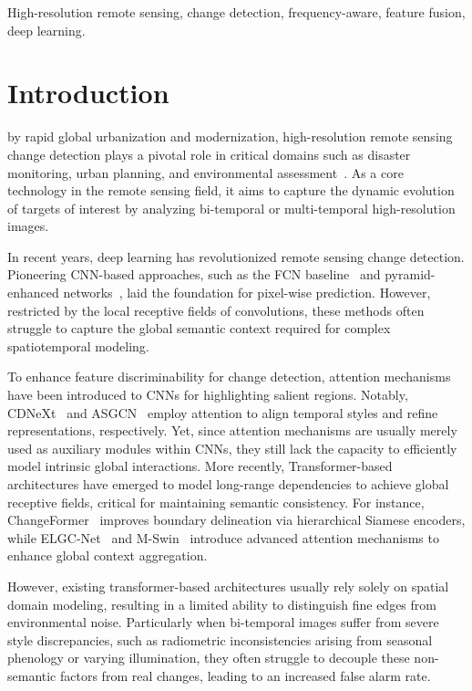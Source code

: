 \documentclass[lettersize,journal]{IEEEtran}
\begin{document}
\begin{IEEEkeywords}
High-resolution remote sensing, change detection, frequency-aware, feature fusion, deep learning.
\end{IEEEkeywords}
\vspace{-5pt}
\section{Introduction}
 by rapid global urbanization and modernization, high-resolution remote sensing change detection plays a pivotal role in critical domains such as disaster monitoring, urban planning, and environmental assessment~\cite{li2022breaking,zheng2022changemask,yang2017monitoring}. As a core technology in the remote sensing field, it aims to capture the dynamic evolution of targets of interest by analyzing bi-temporal or multi-temporal high-resolution images. 

In recent years, deep learning has revolutionized remote sensing change detection. Pioneering CNN-based approaches, such as the FCN baseline~\cite{daudt2018fully} and pyramid-enhanced networks~\cite{lei2019landslide}, laid the foundation for pixel-wise prediction. However, restricted by the local receptive fields of convolutions, these methods often struggle to capture the global semantic context required for complex spatiotemporal modeling.

To enhance feature discriminability for change detection, attention mechanisms have been introduced to CNNs for highlighting salient regions. Notably, CDNeXt~\cite{wei2024robust} and ASGCN~\cite{wang2024attention} employ attention to align temporal styles and refine representations, respectively. Yet, since attention mechanisms are usually merely used as auxiliary modules within CNNs, they still lack the capacity to efficiently model intrinsic global interactions. More recently, Transformer-based architectures have emerged to model long-range dependencies to achieve global receptive fields, critical for maintaining semantic consistency. For instance, ChangeFormer~\cite{bandara2022transformer} improves boundary delineation via hierarchical Siamese encoders, while ELGC-Net~\cite{noman2024elgc} and M-Swin~\cite{pan2024m} introduce advanced attention mechanisms to enhance global context aggregation.

However, existing transformer-based architectures usually rely solely on spatial domain modeling, resulting in a limited ability to distinguish fine edges from environmental noise. Particularly when bi-temporal images suffer from severe style discrepancies, such as radiometric inconsistencies arising from seasonal phenology or varying illumination, they often struggle to decouple these non-semantic factors from real changes, leading to an increased false alarm rate.
\end{document}
